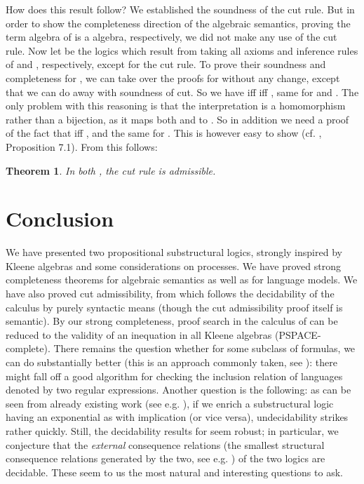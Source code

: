 \documentclass{eptcs}
\newtheorem{thm}[defn]{Theorem}
\begin{document}
How does this result follow? We established the
soundness of the cut rule. But in order to show the completeness
direction of the algebraic semantics, proving the term 
algebra of  is a  algebra, respectively, 
we did not make any use of the cut rule. 
Now let  be the logics which 
result from taking all axioms and inference 
rules of  and , respectively,
except for the cut rule. To prove their soundness and completeness for 
, we can take over the proofs for  without
any change, except that we can do away with soundness of cut. 
So we have  
iff  iff ,
same for  and . The only problem with this reasoning
is that the interpretation  is a homomorphism rather than a
bijection, as it maps both  and  to . So
in addition we need a proof of the fact that 
 iff 
, and the
same for . This is however easy to show (cf. \cite{galatos:residuated},
Proposition 7.1). From this follows: 


\begin{thm}
In both , the cut rule is admissible.
\end{thm}




\section{Conclusion}

We have presented two propositional substructural logics,
strongly inspired by Kleene algebras and 
some considerations on processes. We have proved strong completeness 
theorems for algebraic semantics as well
as for language models. We have also
proved cut admissibility, from which follows the decidability of the
calculus by purely syntactic means (though the cut admissibility
proof itself is semantic). 
By our strong completeness, proof search in the calculus of 
can be reduced to the validity of an inequation in all Kleene algebras
(PSPACE-complete). There remains
the question whether for some subclass 
of formulas, we can do substantially better
(this is an approach commonly taken, see \cite{hovland:inclusion}): 
there might fall off a good 
algorithm for checking the inclusion relation
of languages denoted by two regular expressions.
Another question is the following: as can be seen from already
existing work (see e.g. \cite{buszkowski:action}), if we enrich
a substructural logic having an exponential as  with implication
(or vice versa), undecidability strikes rather quickly. Still,
the decidability results for  seem robust;	 
in particular, 
we conjecture that the \textit{external} consequence
relations (the smallest structural consequence relations generated
by the two, see e.g. \cite{galatos:residuated}) 
of the two logics are decidable.
These seem to us the most natural and
interesting questions to ask. 



\end{document}
